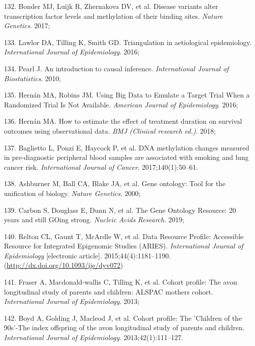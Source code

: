 \documentclass[11pt,twoside]{bristolthesis}
\newenvironment{cslreferences}%
  {}%
  {\par}
\begin{document}
\begin{cslreferences}
\leavevmode\hypertarget{ref-Bonder2017}{}%
132. Bonder MJ, Luijk R, Zhernakova DV, et al. Disease variants alter transcription factor levels and methylation of their binding sites. \emph{Nature Genetics}. 2017;

\leavevmode\hypertarget{ref-Lawlor2016}{}%
133. Lawlor DA, Tilling K, Smith GD. Triangulation in aetiological epidemiology. \emph{International Journal of Epidemiology}. 2016;

\leavevmode\hypertarget{ref-Pearl2010}{}%
134. Pearl J. An introduction to causal inference. \emph{International Journal of Biostatistics}. 2010;

\leavevmode\hypertarget{ref-Hernan2016}{}%
135. Hernán MA, Robins JM. Using Big Data to Emulate a Target Trial When a Randomized Trial Is Not Available. \emph{American Journal of Epidemiology}. 2016;

\leavevmode\hypertarget{ref-Hernan2018}{}%
136. Hernán MA. How to estimate the effect of treatment duration on survival outcomes using observational data. \emph{BMJ (Clinical research ed.)}. 2018;

\leavevmode\hypertarget{ref-Baglietto2017}{}%
137. Baglietto L, Ponzi E, Haycock P, et al. DNA methylation changes measured in pre-diagnostic peripheral blood samples are associated with smoking and lung cancer risk. \emph{International Journal of Cancer}. 2017;140(1):50--61.

\leavevmode\hypertarget{ref-Ashburner2000}{}%
138. Ashburner M, Ball CA, Blake JA, et al. Gene ontology: Tool for the unification of biology. \emph{Nature Genetics}. 2000;

\leavevmode\hypertarget{ref-Carbon2019}{}%
139. Carbon S, Douglass E, Dunn N, et al. The Gene Ontology Resource: 20 years and still GOing strong. \emph{Nucleic Acids Research}. 2019;

\leavevmode\hypertarget{ref-Relton2015-aries}{}%
140. Relton CL, Gaunt T, McArdle W, et al. Data Resource Profile: Accessible Resource for Integrated Epigenomic Studies (ARIES). \emph{International Journal of Epidemiology} {[}electronic article{]}. 2015;44(4):1181--1190. (\url{http://dx.doi.org/10.1093/ije/dyv072})

\leavevmode\hypertarget{ref-Fraser2013}{}%
141. Fraser A, Macdonald-wallis C, Tilling K, et al. Cohort profile: The avon longitudinal study of parents and children: ALSPAC mothers cohort. \emph{International Journal of Epidemiology}. 2013;

\leavevmode\hypertarget{ref-Boyd2013}{}%
142. Boyd A, Golding J, Macleod J, et al. Cohort profile: The 'Children of the 90s'-The index offspring of the avon longitudinal study of parents and children. \emph{International Journal of Epidemiology}. 2013;42(1):111--127.


\end{cslreferences}
\end{document}
